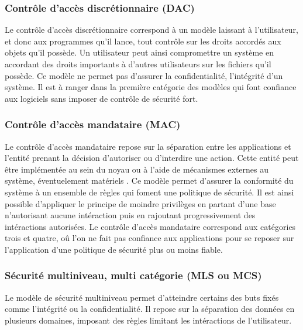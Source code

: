 \subsubsection{Contrôle d'accès discrétionnaire (DAC)}

Le contrôle d'accès discrétionnaire correspond à un modèle laissant à l'utilisateur, et donc aux programmes qu'il lance, tout contrôle sur les droits accordés aux objets qu'il possède. Un utilisateur peut ainsi compromettre un système en accordant des droits importants à d'autres utilisateurs sur les fichiers qu'il possède. Ce modèle ne permet pas d'assurer la confidentialité, l'intégrité d'un système. Il est à ranger dans la première catégorie des modèles qui font confiance aux logiciels sans imposer de contrôle de sécurité fort.

\subsubsection{Contrôle d'accès mandataire (MAC)}

Le contrôle d'accès mandataire repose sur la séparation entre les applications et l'entité prenant la décision d'autoriser ou d'interdire une action. Cette entité peut être implémentée au sein du noyau ou à l'aide de mécanismes externes au système, éventuelement matériels \cite{ITXT}. Ce modèle permet d'assurer la conformité du système à un ensemble de règles qui foment une politique de sécurité. Il est ainsi possible d'appliquer le principe de moindre privilèges en partant d'une base n'autorisant aucune intéraction puis en rajoutant progressivement des intéractions autorisées. Le contrôle d'accès mandataire correspond aux catégories trois et quatre, oû l'on ne fait pas confiance aux applications pour se reposer sur l'application d'une politique de sécurité plus ou moins fiable.


\subsubsection{Sécurité multiniveau, multi catégorie (MLS ou MCS)}

Le modèle de sécurité multiniveau permet d'atteindre certains des buts fixés comme l'intégrité ou la confidentialité. Il repose sur la séparation des données en plusieurs domaines, imposant des règles limitant les intéractions de l'utilisateur.

